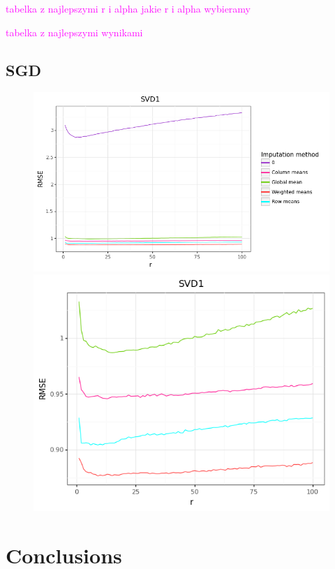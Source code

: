\documentclass[11pt]{amsart}
\newcommand{\tami}[1]{{\textcolor{magenta}{#1}}}
\begin{document}
\tami{tabelka z najlepszymi r i alpha}
\tami{jakie r i alpha wybieramy}

\tami{tabelka z najlepszymi wynikami}

\subsection*{SGD}

\begin{figure}[H]
\centering
\begin{minipage}{.5\textwidth}
  \centering
  \includegraphics[scale=0.43]{svd1_1}
\end{minipage}%
\begin{minipage}{.5\textwidth}
  \centering
  \includegraphics[scale=0.43]{svd1_2}
\end{minipage}
\end{figure}



\section{}

\section{Conclusions}
\end{document}
